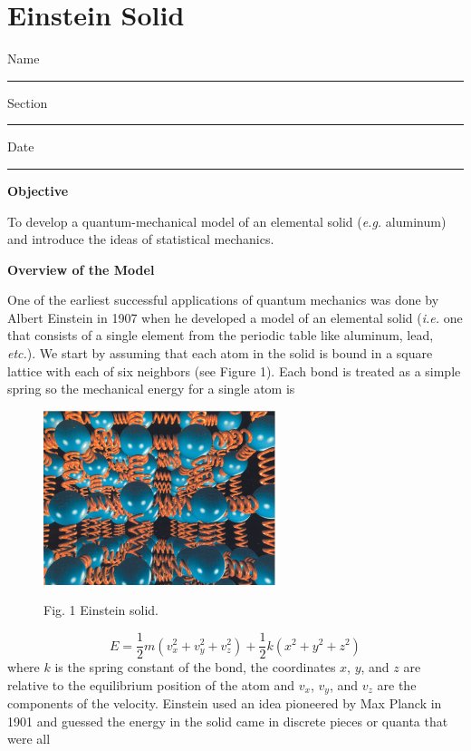 \setcounter{equation}{0}
\setcounter{figure}{0}

\section{Einstein Solid}

Name \rule{2.0in}{0.1pt}\hfill{}Section \rule{1.0in}{0.1pt}\hfill{}Date
\rule{1.0in}{0.1pt}

\textbf{Objective}

To develop a quantum-mechanical model of an elemental solid ({\it e.g.} aluminum) and
introduce the ideas of statistical mechanics.

\textbf{Overview of the Model}

One of the earliest successful applications of quantum mechanics was done by Albert Einstein
in 1907 when he developed a model of an elemental solid ({\it i.e.} one that consists of a single
element from the periodic table like aluminum, lead, {\it etc.}).
We start by assuming that each atom in the solid is bound in a square lattice with each
of six neighbors (see Figure 1). Each bond is treated as a simple spring so the 
mechanical energy for a single atom is
\begin{figure}
\includegraphics[height=2.0in]{EinsteinSolid/einstein_solid_picture2.eps}

\hfil Fig. 1 Einstein solid.\hfil 

\setcounter{figure}{1}

\end{figure}
\begin{equation}
E = \frac{1}{2} m (v_x^2 + v_y^2 + v_z^2) + \frac{1}{2} k (x^2 + y^2 + z^2)
\end{equation}
where $k$ is the spring constant of the bond, the coordinates $x$, $y$, and $z$ are relative to the
equilibrium position of the atom and $v_x$, $v_y$, and $v_z$ are the components of the velocity.
Einstein used an idea pioneered by Max Planck in 1901 and
guessed the energy in the solid came in discrete pieces or quanta that were all
